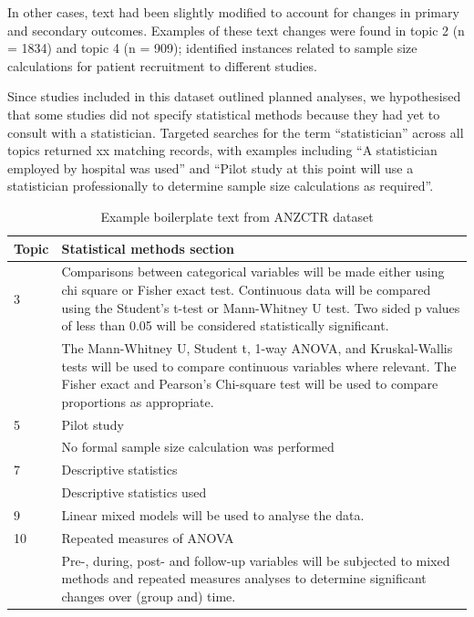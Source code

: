 \documentclass[12pt]{article}
\begin{document}
In other cases, text had been slightly modified to account for changes
in primary and secondary outcomes. Examples of these text changes were
found in topic 2 (n = 1834) and topic 4 (n = 909); identified instances
related to sample size calculations for patient recruitment to different
studies.

Since studies included in this dataset outlined planned analyses, we
hypothesised that some studies did not specify statistical methods because
they had yet to consult with a statistician. Targeted searches for the
term ``statistician'' across all topics returned xx matching records,
with examples including ``A statistician employed by hospital was used''
and ``Pilot study at this point will use a statistician professionally
to determine sample size calculations as required''.

\begin{landscape}
\begin{table}[]
\centering
\caption{Example boilerplate text from ANZCTR dataset}
\label{tab:anzctr-example-boilerplate}
\begin{tabular}{p{0.1\linewidth} p{0.9\linewidth}}
\hline
\textbf{Topic} & \textbf{Statistical methods section} \\ \hline
3 & Comparisons between categorical variables will be made either using chi square or Fisher exact test. Continuous data will be compared using the Student’s t-test or Mann-Whitney U test. Two sided p values of less than 0.05 will be considered statistically significant.\\
 &  The Mann-Whitney U, Student t, 1-way ANOVA, and Kruskal-Wallis tests will be used to compare continuous variables where relevant. The Fisher exact and Pearson’s Chi-square test will be used to compare proportions as appropriate. \\ \hline
5 & Pilot study \\
 &  No formal sample size calculation was performed \\ \hline
7 & Descriptive statistics \\
 &  Descriptive statistics used \\ \hline
9 & Linear mixed models will be used to analyse the data. \\ \hline
10 & Repeated measures of ANOVA \\
 &  Pre-, during, post- and follow-up variables will be subjected to mixed methods and repeated measures analyses to determine significant changes over (group and) time. \\ \hline
\end{tabular}
\end{table}
\end{landscape}
\end{document}
